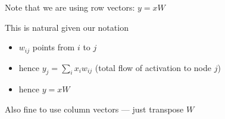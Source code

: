 \begin{frame}
    
    Note that we are using row vectors:  $y = x W$

        \vspace{0.5em}
        \vspace{0.5em}
    This is natural given our notation 

    \begin{itemize}
        \item $w_{ij}$ points from $i$ to $j$
        \vspace{0.5em}
        \item hence $y_j = \sum_i x_i w_{ij} $  (total flow of activation to node $j$)
        \vspace{0.5em}
        \item hence $y = x W$
    \end{itemize}

        \vspace{0.5em}
        \vspace{0.5em}
        \vspace{0.5em}
    Also fine to use column vectors --- just transpose $W$

\end{frame}

